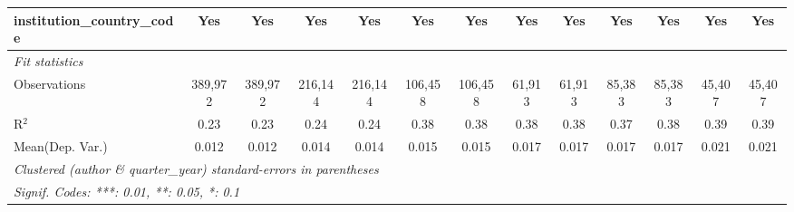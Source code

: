 \begin{tabular}{lcccccccccccc}
   institution\_country\_code               & Yes           & Yes             & Yes           & Yes            & Yes           & Yes           & Yes          & Yes           & Yes           & Yes            & Yes           & Yes\\  
   \midrule
   \emph{Fit statistics}\\
   Observations                             & 389,972       & 389,972         & 216,144       & 216,144        & 106,458       & 106,458       & 61,913       & 61,913        & 85,383        & 85,383         & 45,407        & 45,407\\  
   R$^2$                                    & 0.23          & 0.23            & 0.24          & 0.24           & 0.38          & 0.38          & 0.38         & 0.38          & 0.37          & 0.38           & 0.39          & 0.39\\  
Mean(Dep. Var.) & 0.012 & 0.012 & 0.014 & 0.014 & 0.015 & 0.015 & 0.017 & 0.017 & 0.017 & 0.017 & 0.021 & 0.021 \\
   \midrule \midrule
   \multicolumn{13}{l}{\emph{Clustered (author \& quarter\_year) standard-errors in parentheses}}\\
   \multicolumn{13}{l}{\emph{Signif. Codes: ***: 0.01, **: 0.05, *: 0.1}}\\
\end{tabular}
\par\endgroup
